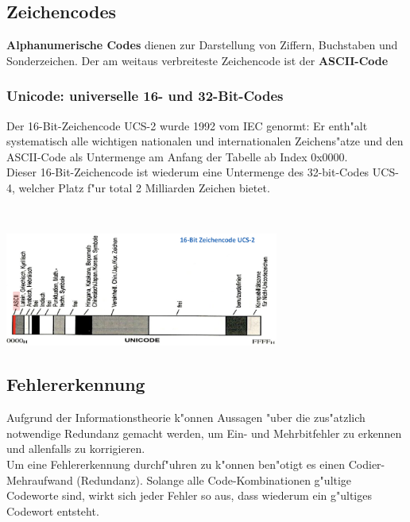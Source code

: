 \subsection{Zeichencodes}
\textbf{Alphanumerische Codes} dienen zur Darstellung von Ziffern, Buchstaben und  Sonderzeichen. Der am weitaus verbreiteste Zeichencode ist der \textbf{ASCII-Code}

\subsubsection{Unicode: universelle 16- und 32-Bit-Codes}
\begin{minipage}{9cm}
\vspace{-4ex}
	Der 16-Bit-Zeichencode UCS-2 wurde 1992 vom IEC genormt: Er enth"alt systematisch alle wichtigen nationalen und internationalen Zeichens"atze und den ASCII-Code als Untermenge am Anfang der Tabelle ab Index 0x0000.\\
	
	Dieser 16-Bit-Zeichencode ist wiederum eine Untermenge des 32-bit-Codes UCS-4, welcher Platz f"ur total 2 Milliarden Zeichen bietet.
\end{minipage}
%
\begin{minipage}{0.5cm}
	\ \
\end{minipage}
%
\begin{minipage}{9cm}
	\includegraphics[width=9cm]{pics/2-Unicode}
\end{minipage}

\subsection{Fehlererkennung}
Aufgrund der Informationstheorie k"onnen Aussagen "uber die zus"atzlich notwendige Redundanz gemacht werden, um Ein- und Mehrbitfehler zu erkennen und allenfalls zu korrigieren.\\
Um eine Fehlererkennung durchf"uhren zu k"onnen ben"otigt es einen Codier-Mehraufwand (Redundanz). Solange alle Code-Kombinationen g"ultige Codeworte sind, wirkt sich jeder Fehler so aus, dass wiederum ein g"ultiges Codewort entsteht.

